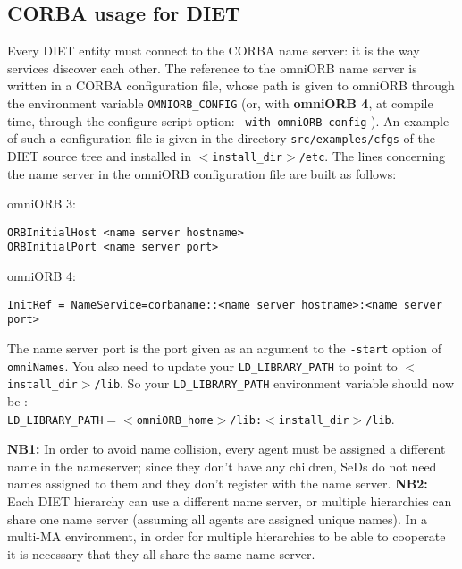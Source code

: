 \subsection{CORBA usage for DIET}

Every DIET entity must connect to the CORBA name server:
it is the way services discover each other. The reference to the
omniORB name server is written in a CORBA configuration file, whose path
is given to omniORB through the environment variable
\texttt{OMNIORB\_CONFIG} (or, with \textbf{omniORB 4}, at compile
time, through the configure script option:
\texttt{--with-omniORB-config} ). An example of such a
configuration file is given in the directory
\texttt{src/examples/cfgs} of the DIET source tree and installed in
\texttt{$<$install\_dir$>$/etc}. The lines concerning the name server
in the omniORB configuration file are built as follows:
\begin{description}
 \item{omniORB 3:}
{\footnotesize
\begin{verbatim}
ORBInitialHost <name server hostname>
ORBInitialPort <name server port>
\end{verbatim}
}
 \item{omniORB 4:}
{\footnotesize
\begin{verbatim}
InitRef = NameService=corbaname::<name server hostname>:<name server
port>
\end{verbatim}
} 
\end{description}
The name server port is the port given as an argument to the
\texttt{-start} option of \texttt{omniNames}.  You also need to update
your \texttt{LD\_LIBRARY\_PATH} to point to
\texttt{$<$install\_dir$>$/lib}.  So your \texttt{LD\_LIBRARY\_PATH}
environment variable should now be :\\ \texttt{LD\_LIBRARY\_PATH$=
<$omniORB\_home$>$/lib:$<$install\_dir$>$/lib}.

\textbf{NB1:} In order to avoid name collision, every agent must be 
assigned a different name in the nameserver; since they don't have any 
children, SeDs do not need names assigned to them and they don't register with
the name server.
\textbf{NB2:} Each DIET hierarchy can use a different name server, or multiple 
hierarchies can share one name server (assuming all agents are assigned 
unique names).  In a multi-MA environment, in order for multiple hierarchies
to be able to cooperate it is necessary that they all share the same
name server.

